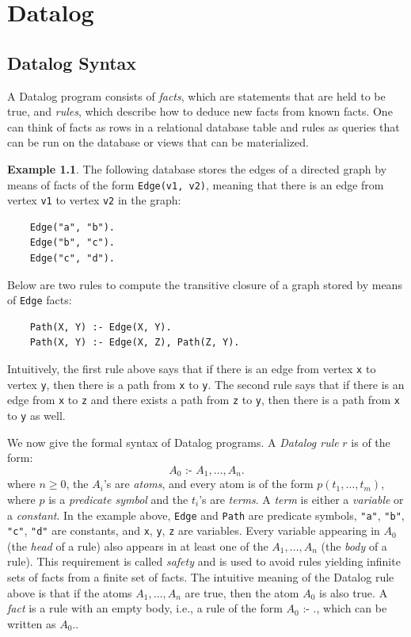 \documentclass[11pt]{report}
\theoremstyle{definition}
\newtheorem{exmp}{Example}[chapter]
\begin{document}

\chapter{Datalog}
\label{ch:datalog}

\section{Datalog Syntax}

A Datalog program consists of \textit{facts}, which are statements that are held to be true, and \textit{rules}, which describe how to deduce new facts from known facts. One can think of facts as rows in a relational database table and rules as queries that can be run on the database or views that can be materialized.

\begin{exmp}
  The following database stores the edges of a directed graph by means of facts of the form
  \texttt{Edge(v1, v2)}, meaning that there is an edge from vertex \texttt{v1} to vertex \texttt{v2} in the graph:
  \begin{verbatim}
    Edge("a", "b").
    Edge("b", "c").
    Edge("c", "d").
  \end{verbatim}
  Below are two rules to compute the transitive closure of a graph stored by means of \texttt{Edge} facts:
  \begin{verbatim}
    Path(X, Y) :- Edge(X, Y).
    Path(X, Y) :- Edge(X, Z), Path(Z, Y).
  \end{verbatim}
  Intuitively, the first rule above says that if there is an edge from vertex \texttt{x} to vertex \texttt{y}, then there is a path from \texttt{x} to \texttt{y}. The second rule says that if there is an edge from \texttt{x} to \texttt{z} and there exists a path from \texttt{z} to \texttt{y}, then there is a path from \texttt{x} to \texttt{y} as well.
\end{exmp}
\label{exmp:tc}

We now give the formal syntax of Datalog programs. A \textit{Datalog rule} $r$ is of the form: $$A_0 \text{ :- } A_1, \ldots, A_n.$$ where $n \geq 0$, the $A_i$'s are \textit{atoms}, and every atom is of the form $p(t_1, \ldots, t_m)$, where $p$ is a \textit{predicate symbol} and the $t_i$'s are \textit{terms}. A \textit{term} is either a \textit{variable} or a \textit{constant}. In the example above, \texttt{Edge} and \texttt{Path} are predicate symbols, \texttt{"a"}, \texttt{"b"}, \texttt{"c"}, \texttt{"d"} are constants, and \texttt{x}, \texttt{y}, \texttt{z} are variables. Every variable appearing in $A_0$ (the \textit{head} of a rule) also appears in at least one of the $A_1, \ldots, A_n$ (the \textit{body} of a rule). This requirement is called \textit{safety} and is used to avoid rules yielding infinite sets of facts from a finite set of facts. The intuitive meaning of the Datalog rule above is that if the atoms $A_1, \ldots, A_n$ are true, then the atom $A_0$ is also true. A \textit{fact} is a rule with an empty body, i.e., a rule of the form $A_0 \text{ :- }.$, which can be written as $A_0.$.
\end{document}

